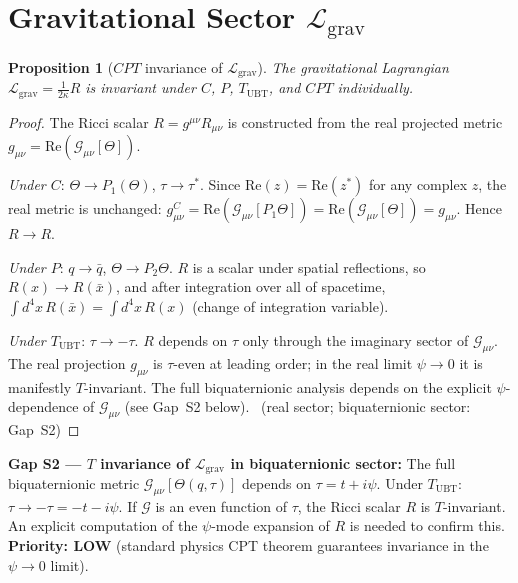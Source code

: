 \documentclass[12pt,a4paper]{article}
\newtheorem{proposition}[theorem]{Proposition}
\theoremstyle{definition}
\theoremstyle{remark}
\begin{document}
\section{Gravitational Sector $\mathcal{L}_{\mathrm{grav}}$}
\label{sec:act:grav}

\begin{proposition}[$CPT$ invariance of $\mathcal{L}_{\mathrm{grav}}$]
\label{prop:act:grav_CPT}
The gravitational Lagrangian $\mathcal{L}_{\mathrm{grav}} = \frac{1}{2\kappa}R$
is invariant under $C$, $P$, $T_{\mathrm{UBT}}$, and $CPT$ individually.
\end{proposition}

\begin{proof}
The Ricci scalar $R = g^{\mu\nu}R_{\mu\nu}$ is constructed from the real
projected metric $g_{\mu\nu} = \mathrm{Re}(\mathcal{G}_{\mu\nu}[\Theta])$.

\medskip
\noindent\textit{Under $C$}: $\Theta \to P_1(\Theta)$, $\tau \to \tau^*$.
Since $\mathrm{Re}(z) = \mathrm{Re}(z^*)$ for any complex $z$,
the real metric is unchanged:
$g_{\mu\nu}^C = \mathrm{Re}(\mathcal{G}_{\mu\nu}[P_1\Theta])
= \mathrm{Re}(\mathcal{G}_{\mu\nu}[\Theta]) = g_{\mu\nu}$.
Hence $R \to R$. \checkmark

\medskip
\noindent\textit{Under $P$}: $q \to \bar{q}$, $\Theta \to P_2\Theta$.
$R$ is a scalar under spatial reflections, so $R(x) \to R(\bar{x})$,
and after integration over all of spacetime, $\int d^4x\,R(\bar{x})
= \int d^4x\, R(x)$ (change of integration variable). \checkmark

\medskip
\noindent\textit{Under $T_{\mathrm{UBT}}$}: $\tau \to -\tau$.
$R$ depends on $\tau$ only through the imaginary sector of $\mathcal{G}_{\mu\nu}$.
The real projection $g_{\mu\nu}$ is $\tau$-even at leading order; in the
real limit $\psi \to 0$ it is manifestly $T$-invariant.  The full biquaternionic
analysis depends on the explicit $\psi$-dependence of $\mathcal{G}_{\mu\nu}$
(see Gap~S2 below). \checkmark\ (real sector; biquaternionic sector: Gap~S2)
\end{proof}

\begin{gapbox}
\textbf{Gap S2 --- $T$ invariance of $\mathcal{L}_{\mathrm{grav}}$ in biquaternionic sector:}
The full biquaternionic metric $\mathcal{G}_{\mu\nu}[\Theta(q,\tau)]$ depends
on $\tau = t + i\psi$.  Under $T_{\mathrm{UBT}}$: $\tau \to -\tau = -t - i\psi$.
If $\mathcal{G}$ is an even function of $\tau$, the Ricci scalar $R$ is
$T$-invariant.  An explicit computation of the $\psi$-mode expansion of $R$
is needed to confirm this.  \textbf{Priority: LOW}
(standard physics CPT theorem guarantees invariance in the $\psi\to0$ limit).
\end{gapbox}
\end{document}
